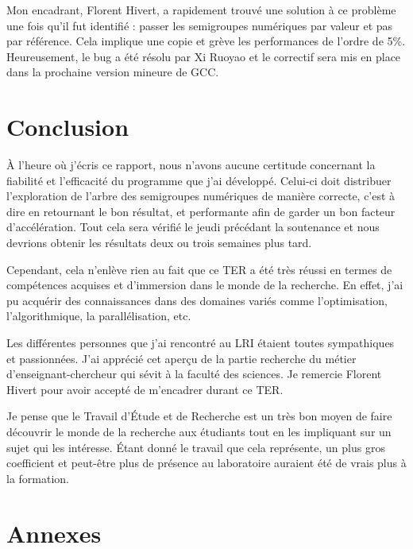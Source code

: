 \documentclass[12pt,a4paper]{report}
\begin{document}
Mon encadrant, Florent Hivert, a rapidement trouvé une solution à ce problème une fois qu'il fut identifié : passer les semigroupes numériques par valeur et pas par référence. Cela implique une copie et grève les performances de l'ordre de 5\%. Heureusement, le bug a été résolu par Xi Ruoyao et le correctif sera mis en place dans la prochaine version mineure de GCC.

\chapter*{Conclusion}

À l'heure où j'écris ce rapport, nous n'avons aucune certitude concernant la fiabilité et l'efficacité du programme que j'ai développé. Celui-ci doit distribuer l'exploration de l'arbre des semigroupes numériques de manière correcte, c'est à dire en retournant le bon résultat, et performante afin de garder un bon facteur d'accélération. Tout cela sera vérifié le jeudi précédant la soutenance et nous devrions obtenir les résultats deux ou trois semaines plus tard.

Cependant, cela n'enlève rien au fait que ce TER a été très réussi en termes de compétences acquises et d'immersion dans le monde de la recherche. En effet, j'ai pu acquérir des connaissances dans des domaines variés comme l'optimisation, l'algorithmique, la parallélisation, etc.

Les différentes personnes que j'ai rencontré au LRI étaient toutes sympathiques et passionnées. J'ai apprécié cet aperçu de la partie recherche du métier d'enseignant-chercheur qui sévit à la faculté des sciences. Je remercie Florent Hivert pour avoir accepté de m'encadrer durant ce TER.

Je pense que le Travail d'Étude et de Recherche est un très bon moyen de faire découvrir le monde de la recherche aux étudiants tout en les impliquant sur un sujet qui les intéresse. Étant donné le travail que cela représente, un plus gros coefficient et peut-être plus de présence au laboratoire auraient été de vrais plus à la formation.

\printbibliography
{}

\chapter*{Annexes}
\renewcommand{\thesection}{\Roman{section}}
\setcounter{section}{0}
\end{document}
